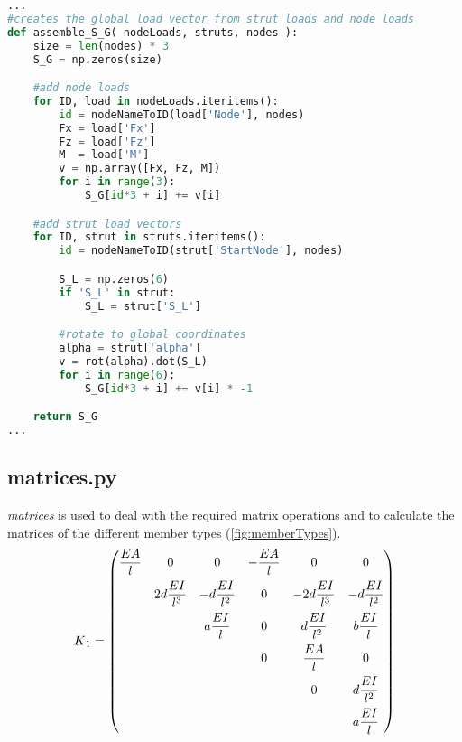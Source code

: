 \begin{inconsolata}
\begin{minipage}{\linewidth}
\begin{lstlisting}[language=python]
...
#creates the global load vector from strut loads and node loads
def assemble_S_G( nodeLoads, struts, nodes ):
    size = len(nodes) * 3
    S_G = np.zeros(size)

    #add node loads
    for ID, load in nodeLoads.iteritems():
        id = nodeNameToID(load['Node'], nodes)
        Fx = load['Fx']
        Fz = load['Fz']
        M  = load['M']
        v = np.array([Fx, Fz, M])
        for i in range(3):
            S_G[id*3 + i] += v[i]

    #add strut load vectors
    for ID, strut in struts.iteritems():
        id = nodeNameToID(strut['StartNode'], nodes)

        S_L = np.zeros(6)
        if 'S_L' in strut:
            S_L = strut['S_L']

        #rotate to global coordinates
        alpha = strut['alpha']
        v = rot(alpha).dot(S_L)
        for i in range(6):
            S_G[id*3 + i] += v[i] * -1

    return S_G
...
\end{lstlisting}
\end{minipage}
\end{inconsolata}

\subsection{matrices.py}
\label{subsec:matrices.py}

\textit{matrices} is used to deal with the required matrix operations and to calculate the matrices of the different member types (\cref{fig:memberTypes}).
\begin{equation} \label{K1}
K\textsubscript{1} = \begin{pmatrix}
\dfrac{EA}{l} & 0                   & 0                   & -\dfrac{EA}{l}  & 0                   & 0                   \\[0.8em]
              & 2d\dfrac{EI}{l^3}   & -d\dfrac{EI}{l^2}   & 0               & -2d\dfrac{EI}{l^3}  & -d\dfrac{EI}{l^2}   \\[0.8em]
              &                     & a\dfrac{EI}{l}      & 0               & d\dfrac{EI}{l^2}    & b\dfrac{EI}{l}      \\[0.8em]
              &                     &                     & 0               & \dfrac{EA}{l}       & 0                   \\[0.8em]
              &                     &                     &                 & 0                   & d\dfrac{EI}{l^2}    \\[0.8em]
              &                     &                     &                 &                     & a\dfrac{EI}{l}
     \end{pmatrix}
\end{equation}

